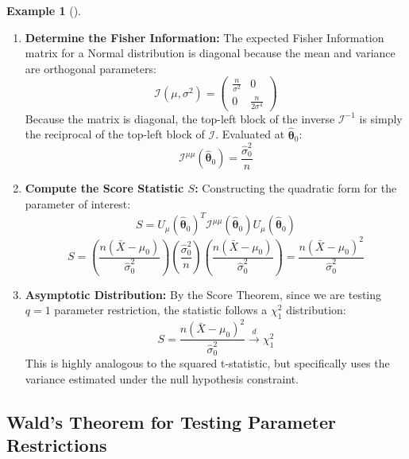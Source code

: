 \documentclass[
  letterpaper,
  DIV=11,
  numbers=noendperiod]{scrreprt}
\renewcommand{\[}{\begin{equation}}
\renewcommand{\]}{\end{equation}}
\theoremstyle{definition}
\theoremstyle{plain}
\theoremstyle{plain}
\theoremstyle{plain}
\theoremstyle{definition}
\newtheorem{example}{Example}[chapter]
\theoremstyle{plain}
\theoremstyle{remark}
\begin{document}
\begin{example}[]
\begin{enumerate}
  Because
  \(\hat{\sigma}_0^2 = \frac{1}{n}\sum_{i=1}^n (X_i - \mu_0)^2\), the
  second component perfectly cancels out. By definition, the score for
  the nuisance parameter evaluated at the restricted MLE is zero:
  \[\mathbf{U}(\hat{\boldsymbol{\theta}}_0) = \begin{pmatrix} \frac{n(\bar{X} - \mu_0)}{\hat{\sigma}_0^2} \\ 0 \end{pmatrix}\]
\item
  \textbf{Determine the Fisher Information:} The expected Fisher
  Information matrix for a Normal distribution is diagonal because the
  mean and variance are orthogonal parameters:
  \[\mathcal{I}(\mu, \sigma^2) = \begin{pmatrix} \frac{n}{\sigma^2} & 0 \\ 0 & \frac{n}{2\sigma^4} \end{pmatrix}\]
  Because the matrix is diagonal, the top-left block of the inverse
  \(\mathcal{I}^{-1}\) is simply the reciprocal of the top-left block of
  \(\mathcal{I}\). Evaluated at \(\hat{\boldsymbol{\theta}}_0\):
  \[\mathcal{I}^{\mu\mu}(\hat{\boldsymbol{\theta}}_0) = \frac{\hat{\sigma}_0^2}{n}\]
\item
  \textbf{Compute the Score Statistic \(S\):} Constructing the quadratic
  form for the parameter of interest:
  \[S = U_\mu(\hat{\boldsymbol{\theta}}_0)^T \mathcal{I}^{\mu\mu}(\hat{\boldsymbol{\theta}}_0) U_\mu(\hat{\boldsymbol{\theta}}_0)\]
  \[S = \left( \frac{n(\bar{X} - \mu_0)}{\hat{\sigma}_0^2} \right) \left( \frac{\hat{\sigma}_0^2}{n} \right) \left( \frac{n(\bar{X} - \mu_0)}{\hat{\sigma}_0^2} \right) = \frac{n(\bar{X} - \mu_0)^2}{\hat{\sigma}_0^2}\]
\item
  \textbf{Asymptotic Distribution:} By the Score Theorem, since we are
  testing \(q=1\) parameter restriction, the statistic follows a
  \(\chi^2_1\) distribution:
  \[S = \frac{n(\bar{X} - \mu_0)^2}{\hat{\sigma}_0^2} \xrightarrow{d} \chi^2_1\]
  This is highly analogous to the squared t-statistic, but specifically
  uses the variance estimated under the null hypothesis constraint.
\end{enumerate}

\end{example}

\subsection{Wald's Theorem for Testing Parameter
Restrictions}\label{walds-theorem-for-testing-parameter-restrictions}
\end{document}

